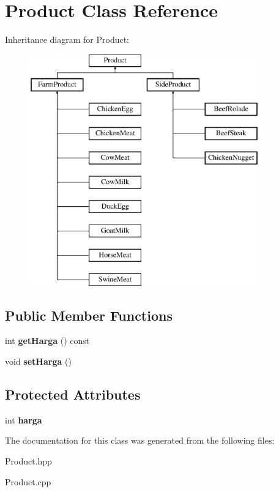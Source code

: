 \hypertarget{class_product}{}\section{Product Class Reference}
\label{class_product}
Inheritance diagram for Product\+:\begin{figure}[H]
\begin{center}
\leavevmode
\includegraphics[height=10.000000cm]{class_product}
\end{center}
\end{figure}
\subsection*{Public Member Functions}
\begin{DoxyCompactItemize}
\item 
\mbox{\label{class_product_aaaa6866dd9d4e2c6d6f21cffcdd549c3}} 
int {\bfseries get\+Harga} () const
\item 
\mbox{\label{class_product_ac54d1c6a7c6c54f70d31c6457df88fec}} 
void {\bfseries set\+Harga} ()
\end{DoxyCompactItemize}
\subsection*{Protected Attributes}
\begin{DoxyCompactItemize}
\item 
\mbox{\label{class_product_a987b9fc5fa69c36fec40d5e77a4cfa51}} 
int {\bfseries harga}
\end{DoxyCompactItemize}


The documentation for this class was generated from the following files\+:\begin{DoxyCompactItemize}
\item 
Product.\+hpp\item 
Product.\+cpp\end{DoxyCompactItemize}
